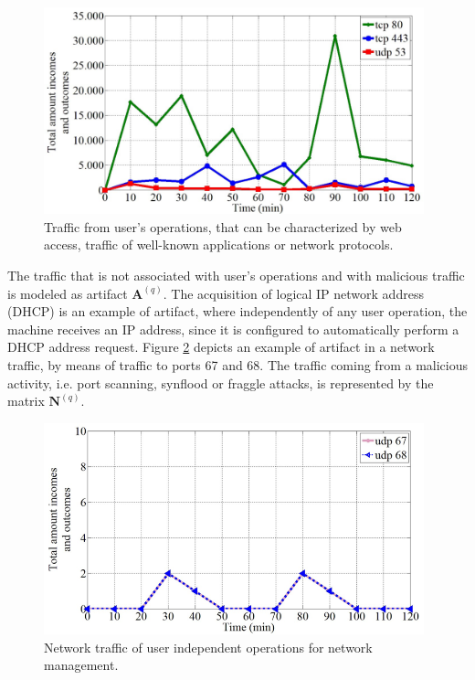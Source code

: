 \begin{figure}[h!]
     \centering 
     \includegraphics[width=11cm]{figures/ch2/fig03.png}
     \caption{Traffic from user's operations, that can be characterized by web access, traffic of well-known applications or network protocols.}
     \label{fig:2.03}
\end{figure}

The traffic that is not associated with user's operations and with malicious traffic is modeled as artifact $\pmb{A}^{(q)}$. The acquisition of logical IP network address (DHCP) is an example of artifact, where independently of any user operation, the machine receives an IP address, since it is configured to automatically perform a DHCP address request. Figure \ref{fig:2.04} depicts an example of artifact in a network traffic, by means of traffic to ports 67 and 68. The traffic coming from a malicious activity, i.e. port scanning, synflood or fraggle attacks, is represented by the matrix $\pmb{N}^{(q)}$.

\begin{figure}[h!]
     \centering 
     \includegraphics[width=11cm]{figures/ch2/fig04.png}
     \caption{Network traffic of user independent operations for network management.}
     \label{fig:2.04}
\end{figure}

